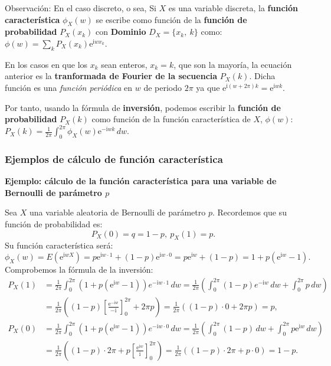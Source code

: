 \documentclass[]{book}
\begin{document}
Observación:
En el caso discreto, o sea, Si \(X\) es una variable discreta, la \textbf{función característica} \(\phi_X(w)\) se escribe como función de la \textbf{función de probabilidad} \(P_X(x_k)\) con \textbf{Dominio} \(D_X=\{x_k,\ k\}\) como:
\(\phi(w)=\sum_{k} P_X(x_k)\mathrm{e}^{\mathrm{i}w x_k}.\)

En los casos en que los \(x_k\) sean enteros, \(x_k=k\), que son la mayoría, la ecuación anterior es la \textbf{tranformada de Fourier de la secuencia} \(P_X(k)\). Dicha función es una \emph{función periódica} en \(w\) de periodo \(2\pi\) ya que \(\mathrm{e}^{\mathrm{i}(w+2\pi)k}=\mathrm{e}^{\mathrm{i}wk}.\)

Por tanto, usando la fórmula de \textbf{inversión}, podemos escribir la \textbf{función de probabilidad} \(P_X(k)\) como función de la función característica de \(X\), \(\phi(w)\):
\(P_X(k)=\frac{1}{2\pi}\int_{0}^{2\pi} \phi_X(w)\mathrm{e}^{-\mathrm{i}w k}\, dw.\)

\hypertarget{ejemplos-de-cuxe1lculo-de-funciuxf3n-caracteruxedstica}{%
\subsubsection{Ejemplos de cálculo de función característica}\label{ejemplos-de-cuxe1lculo-de-funciuxf3n-caracteruxedstica}}

\textbf{Ejemplo: cálculo de la función característica para una variable de Bernoulli de parámetro \(p\)}

Sea \(X\) una variable aleatoria de Bernoulli de parámetro \(p\). Recordemos que su función de probabilidad es:
\[
P_X(0)=q=1-p,\ p_X(1)=p.
\]
Su función característica será:
\[
\phi_X (w)=E\left(\mathrm{e}^{\mathrm{i}wX}\right) =p\mathrm{e}^{\mathrm{i}w\cdot 1}+(1-p)\mathrm{e}^{\mathrm{i}w\cdot 0}=p\mathrm{e}^{\mathrm{i}w}+(1-p)=1+p\left(\mathrm{e}^{\mathrm{i}w} -1 \right).
\]
Comprobemos la fórmula de la inversión:
\[
\begin{array}{rl}
P_X(1) & = \frac{1}{2\pi}\int_0^{2\pi} \left(1+p\left(\mathrm{e}^{\mathrm{i}w} -1 \right)\right) e^{-\mathrm{i}w\cdot 1}\, dw =\frac{1}{2\pi}\left(\int_0^{2\pi} (1-p)e^{-\mathrm{i}w}\, dw + \int_0^{2\pi} p\, dw\right) \\ & = \frac{1}{2\pi}\left( (1-p) \left[\frac{\mathrm{e}^{-\mathrm{i}w}}{-\mathrm{i}}\right]_0^{2\pi} +2\pi p\right)=\frac{1}{2\pi}\left((1-p)\cdot 0 +2\pi p\right)=p, \\
P_X(0) & = \frac{1}{2\pi}\int_0^{2\pi} \left(1+p\left(\mathrm{e}^{\mathrm{i}w} -1 \right)\right) e^{-\mathrm{i}w\cdot 0}\, dw =\frac{1}{2\pi}\left(\int_0^{2\pi} (1-p) \, dw + \int_0^{2\pi} p \mathrm{e}^{\mathrm{i}w}\, dw\right) \\ & = \frac{1}{2\pi}\left( (1-p) \cdot 2\pi  +p \left[\frac{\mathrm{e}^{\mathrm{i}w}}{\mathrm{i}}\right]_0^{2\pi}\right)=\frac{1}{2\pi}\left((1-p)\cdot 2\pi + p\cdot 0\right)=1-p.
\end{array}
\]
\end{document}
